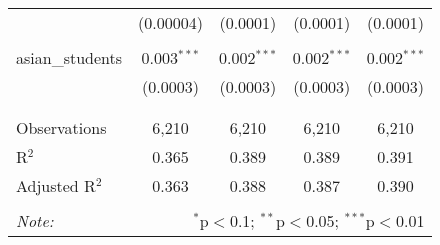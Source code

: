 \begin{table}[!htbp]
\begin{tabular}{@{\extracolsep{-2pt}}lcccc}
  & (0.00004) & (0.0001) & (0.0001) & (0.0001) \\ 
  & & & & \\ 
 asian\_students & 0.003$^{***}$ & 0.002$^{***}$ & 0.002$^{***}$ & 0.002$^{***}$ \\ 
  & (0.0003) & (0.0003) & (0.0003) & (0.0003) \\ 
  & & & & \\ 
\hline \\[-1.8ex] 
Observations & 6,210 & 6,210 & 6,210 & 6,210 \\ 
R$^{2}$ & 0.365 & 0.389 & 0.389 & 0.391 \\ 
Adjusted R$^{2}$ & 0.363 & 0.388 & 0.387 & 0.390 \\ 
\hline 
\hline \\[-1.8ex] 
\textit{Note:}  & \multicolumn{4}{r}{$^{*}$p$<$0.1; $^{**}$p$<$0.05; $^{***}$p$<$0.01} \\ 
\end{tabular} 
\end{table} 
